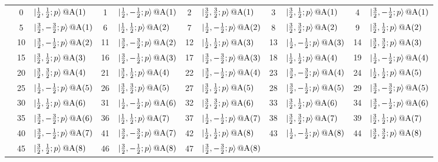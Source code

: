 \documentclass[fleqn,10pt,landscape]{jsarticle}
\begin{document}
\begin{longtable}[l]{c|cl|cl|cl|cl|cl}
 & 0 & $\ket{\frac{1}{2},\frac{1}{2};p}@{\rm A}(1)$ & 1 & $\ket{\frac{1}{2},- \frac{1}{2};p}@{\rm A}(1)$ & 2 & $\ket{\frac{3}{2},\frac{3}{2};p}@{\rm A}(1)$ & 3 & $\ket{\frac{3}{2},\frac{1}{2};p}@{\rm A}(1)$ & 4 & $\ket{\frac{3}{2},- \frac{1}{2};p}@{\rm A}(1)$ \\
& 5 & $\ket{\frac{3}{2},- \frac{3}{2};p}@{\rm A}(1)$ & 6 & $\ket{\frac{1}{2},\frac{1}{2};p}@{\rm A}(2)$ & 7 & $\ket{\frac{1}{2},- \frac{1}{2};p}@{\rm A}(2)$ & 8 & $\ket{\frac{3}{2},\frac{3}{2};p}@{\rm A}(2)$ & 9 & $\ket{\frac{3}{2},\frac{1}{2};p}@{\rm A}(2)$ \\
& 10 & $\ket{\frac{3}{2},- \frac{1}{2};p}@{\rm A}(2)$ & 11 & $\ket{\frac{3}{2},- \frac{3}{2};p}@{\rm A}(2)$ & 12 & $\ket{\frac{1}{2},\frac{1}{2};p}@{\rm A}(3)$ & 13 & $\ket{\frac{1}{2},- \frac{1}{2};p}@{\rm A}(3)$ & 14 & $\ket{\frac{3}{2},\frac{3}{2};p}@{\rm A}(3)$ \\
& 15 & $\ket{\frac{3}{2},\frac{1}{2};p}@{\rm A}(3)$ & 16 & $\ket{\frac{3}{2},- \frac{1}{2};p}@{\rm A}(3)$ & 17 & $\ket{\frac{3}{2},- \frac{3}{2};p}@{\rm A}(3)$ & 18 & $\ket{\frac{1}{2},\frac{1}{2};p}@{\rm A}(4)$ & 19 & $\ket{\frac{1}{2},- \frac{1}{2};p}@{\rm A}(4)$ \\
& 20 & $\ket{\frac{3}{2},\frac{3}{2};p}@{\rm A}(4)$ & 21 & $\ket{\frac{3}{2},\frac{1}{2};p}@{\rm A}(4)$ & 22 & $\ket{\frac{3}{2},- \frac{1}{2};p}@{\rm A}(4)$ & 23 & $\ket{\frac{3}{2},- \frac{3}{2};p}@{\rm A}(4)$ & 24 & $\ket{\frac{1}{2},\frac{1}{2};p}@{\rm A}(5)$ \\
& 25 & $\ket{\frac{1}{2},- \frac{1}{2};p}@{\rm A}(5)$ & 26 & $\ket{\frac{3}{2},\frac{3}{2};p}@{\rm A}(5)$ & 27 & $\ket{\frac{3}{2},\frac{1}{2};p}@{\rm A}(5)$ & 28 & $\ket{\frac{3}{2},- \frac{1}{2};p}@{\rm A}(5)$ & 29 & $\ket{\frac{3}{2},- \frac{3}{2};p}@{\rm A}(5)$ \\
& 30 & $\ket{\frac{1}{2},\frac{1}{2};p}@{\rm A}(6)$ & 31 & $\ket{\frac{1}{2},- \frac{1}{2};p}@{\rm A}(6)$ & 32 & $\ket{\frac{3}{2},\frac{3}{2};p}@{\rm A}(6)$ & 33 & $\ket{\frac{3}{2},\frac{1}{2};p}@{\rm A}(6)$ & 34 & $\ket{\frac{3}{2},- \frac{1}{2};p}@{\rm A}(6)$ \\
& 35 & $\ket{\frac{3}{2},- \frac{3}{2};p}@{\rm A}(6)$ & 36 & $\ket{\frac{1}{2},\frac{1}{2};p}@{\rm A}(7)$ & 37 & $\ket{\frac{1}{2},- \frac{1}{2};p}@{\rm A}(7)$ & 38 & $\ket{\frac{3}{2},\frac{3}{2};p}@{\rm A}(7)$ & 39 & $\ket{\frac{3}{2},\frac{1}{2};p}@{\rm A}(7)$ \\
& 40 & $\ket{\frac{3}{2},- \frac{1}{2};p}@{\rm A}(7)$ & 41 & $\ket{\frac{3}{2},- \frac{3}{2};p}@{\rm A}(7)$ & 42 & $\ket{\frac{1}{2},\frac{1}{2};p}@{\rm A}(8)$ & 43 & $\ket{\frac{1}{2},- \frac{1}{2};p}@{\rm A}(8)$ & 44 & $\ket{\frac{3}{2},\frac{3}{2};p}@{\rm A}(8)$ \\
& 45 & $\ket{\frac{3}{2},\frac{1}{2};p}@{\rm A}(8)$ & 46 & $\ket{\frac{3}{2},- \frac{1}{2};p}@{\rm A}(8)$ & 47 & $\ket{\frac{3}{2},- \frac{3}{2};p}@{\rm A}(8)$ &  &  &  &  \\
\end{longtable}
\end{document}
